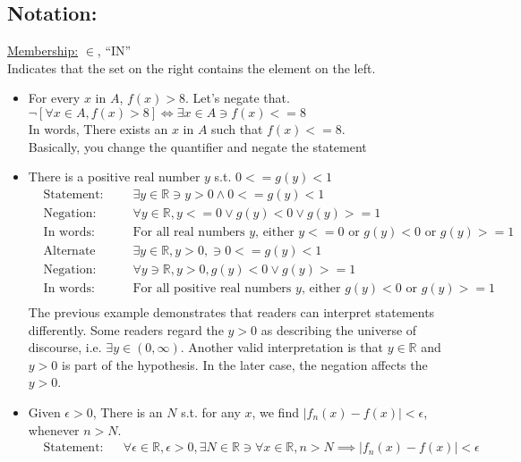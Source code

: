 \documentclass{article}
\begin{document}
\subsection{Notation:}
\underline{Membership:} $\in$, ``IN''\\
Indicates that the set on the right contains the element on the left.\\
\begin{itemize}
	\item For every $x$ in $A$, $f(x) > 8$. Let's negate that.\\
	$\neg [ \forall x \in A, f(x) > 8 ] \iff \exists x \in A \ni f(x) <= 8$\\
	In words, There exists an $x$ in $A$ such that $f(x) <= 8$.\\
	Basically, you change the quantifier and negate the statement
	\item There is a positive real number $y$ s.t. $0 <= g(y) < 1$
	\begin{align*}
		& \text{Statement:} && \exists y \in \mathbb{R} \ni y > 0 \wedge 0 <= g(y) < 1\\
		& \text{Negation:} && \forall y \in \mathbb{R}, y <= 0 \vee g(y) < 0 \vee g(y) >= 1\\
		& \text{In words:} && \text{For all real numbers $y$, either $y <= 0$ or $g(y) < 0$ or $g(y) >= 1$}\\
		& \text{Alternate Statement:} && \exists y \in \mathbb{R}, y > 0, \ni 0 <= g(y) < 1\\
		& \text{Negation:} && \forall y \ni \mathbb{R}, y > 0, g(y) < 0 \vee g(y) >= 1\\
		& \text{In words:} && \text{For all positive real numbers $y$, either $g(y) < 0$ or $g(y) >= 1$}\\
	\end{align*}
	The previous example demonstrates that readers can interpret statements differently. Some readers regard the $y > 0$ as describing the universe of discourse, i.e. $\exists y \in (0, \infty)$. Another valid interpretation is that $y \in \mathbb{R}$ and $y > 0$ is part of the hypothesis. In the later case, the negation affects the $y > 0$.
	\item Given $\epsilon > 0$, There is an $N$ s.t. for any $x$, we find $|f_n(x) - f(x)| < \epsilon$, whenever $n > N$.
	\begin{align*}
		& \text{Statement:} && \forall \epsilon \in \mathbb{R}, \epsilon > 0, \exists N \in \mathbb{R} \ni \forall x \in \mathbb{R}, n > N \implies |f_n(x) - f(x) | < \epsilon \\

\end{align*}
\end{itemize}
\end{document}
